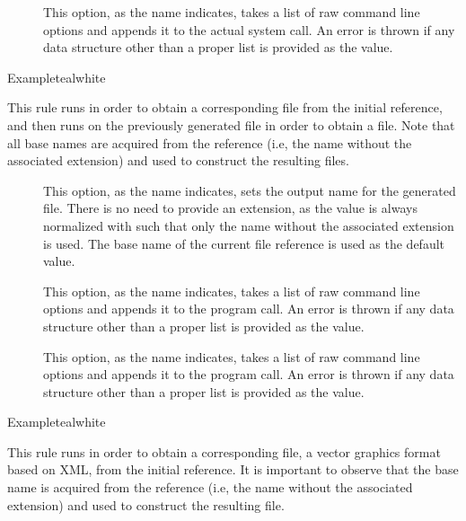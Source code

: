 \begin{description}
\begin{description}
\item[] This option, as the name indicates, takes a list of raw command line options and appends it to the actual system call. An error is thrown if any data structure other than a proper list is provided as the value.
\end{description}

\begin{codebox}{Example}{teal}{\icnote}{white}
\end{codebox}

\item[\rulebox{dvipspdf}]
This rule runs  in order to obtain a corresponding  file from the initial  reference, and then runs  on the previously generated  file in order to obtain a  file. Note that all base names are acquired from the  reference (i.e, the name without the associated extension) and used to construct the resulting files.

\begin{description}
\item[] This option, as the name indicates, sets the output name for the generated  file. There is no need to provide an extension, as the value is always normalized with  such that only the name without the associated extension is used. The base name of the current file reference is used as the default value.

\item[] This option, as the name indicates, takes a list of raw command line options and appends it to the  program call. An error is thrown if any data structure other than a proper list is provided as the value.

\item[] This option, as the name indicates, takes a list of raw command line options and appends it to the  program call. An error is thrown if any data structure other than a proper list is provided as the value.
\end{description}

\begin{codebox}{Example}{teal}{\icnote}{white}
\end{codebox}

\item[\rulebox{dvisvgm}]
This rule runs  in order to obtain a corresponding  file, a vector graphics format based on XML, from the initial reference. It is important to observe that the base name is acquired from the  reference (i.e, the name without the associated extension) and used to construct the resulting file.


\end{description}

